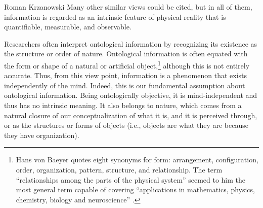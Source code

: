 \begin{artengenv}{Roman Krzanowski}
Many other similar views could be cited, but in all of them, information is regarded as an intrinsic feature of physical reality that is quantifiable, measurable, and observable.

Researchers often interpret ontological information by recognizing its existence as the structure or order of nature. Ontological information is often equated with the form or shape of a natural or artificial object,\footnote{Hans von Baeyer quotes eight synonyms for form: arrangement, configuration, order, organization, pattern, structure, and relationship. The term ``relationships among the parts of the physical system'' seemed to him the most general term capable of covering ``applications in mathematics, physics, chemistry, biology and neuroscience''
\parencite[][p.22]{baeyer_information_2005}.%
} although this is not entirely accurate. Thus, from this view point, information is a phenomenon that exists independently of the mind. Indeed, this is our fundamental assumption about ontological information. Being ontologically objective, it is mind-independent and thus has no intrinsic meaning. It also belongs to nature, which comes from a natural closure of our conceptualization of what it is, and it is perceived through, or as the structures or forms of objects (i.e., objects are what they are because they have organization).


\end{artengenv}
